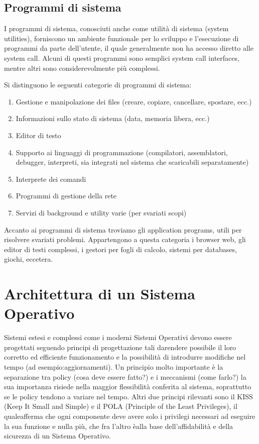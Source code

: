 \documentclass[a4paper]{article}
\begin{document}
\subsection{Programmi di sistema}
I programmi di sistema, conosciuti anche come utilità di sistema (system utilities), forniscono un ambiente funzionale per lo sviluppo e l'esecuzione di programmi da parte dell'utente, il quale generalmente non ha accesso diretto alle system call. Alcuni di questi programmi sono semplici system call interfaces, mentre altri sono considerevolmente più complessi.

Si distinguono le seguenti categorie di programmi di sistema:
\begin{enumerate}
    \item Gestione e manipolazione dei files (creare, copiare, cancellare, spostare, ecc.)
    \item Informazioni sullo stato di sistema (data, memoria libera, ecc.)
    \item Editor di testo
    \item Supporto ai linguaggi di programmazione (compilatori, assemblatori, debugger, interpreti, sia integrati nel sistema che scaricabili separatamente)
    \item Interprete dei comandi
    \item Programmi di gestione della rete
    \item Servizi di background e utility varie (per svariati scopi)
\end{enumerate}

Accanto ai programmi di sistema troviamo gli application programs, utili per risolvere svariati problemi. Appartengono a questa categoria i browser web, gli editor di testi complessi, i gestori per fogli di calcolo, sistemi per databases, giochi, eccetera.


\section{Architettura di un Sistema Operativo}
Sistemi estesi e complessi come i moderni Sistemi Operativi devono essere progettati seguendo principi di progettazione tali darendere possibile il loro corretto ed efficiente funzionamento e la possibilità di introdurre modifiche nel tempo (ad esempio:aggiornamenti). Un principio molto importante è la separazione tra policy (cosa deve essere fatto?) e i meccanismi (come farlo?) la sua importanza risiede nella maggior flessibilità conferita al sistema, soprattutto se le policy tendono a variare nel tempo.
Altri due principi rilevanti sono il KISS (Keep It Small and Simple) e il POLA (Principle of the Least Privileges), il qualeafferma che ogni componente deve avere solo i privilegi necessari ad eseguire la sua funzione e nulla più, che fra l'altro èalla base dell'affidabilità e della sicurezza di un Sistema Operativo.
\end{document}
